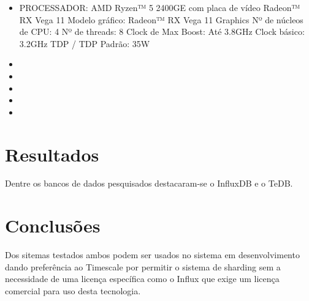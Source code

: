 \documentclass[conference,harvard,brazil,english]{sbatex}
\begin{document}
\begin{itemize}
    \item PROCESSADOR:
AMD Ryzen™ 5 2400GE com placa de vídeo Radeon™ RX Vega 11
Modelo gráfico: Radeon™ RX Vega 11 Graphics
Nº de núcleos de CPU: 4
Nº de threads: 8
Clock de Max Boost: Até 3.8GHz
Clock básico: 3.2GHz
TDP / TDP Padrão: 35W

    \item
    \item
    \item
    \item
    \item
    
    
\end{itemize}







\section{Resultados}
\label{sec:resultados}

Dentre os bancos de dados pesquisados destacaram-se o InfluxDB e o TeDB.



\section{Conclusões}
\label{sec:conclusão}

Dos sitemas testados ambos podem ser usados no sistema em desenvolvimento dando preferência ao Timescale por permitir o sistema de sharding sem a necessidade de uma licença específica como o Influx que exige um licença comercial para uso desta tecnologia.
 
 





\end{document}
